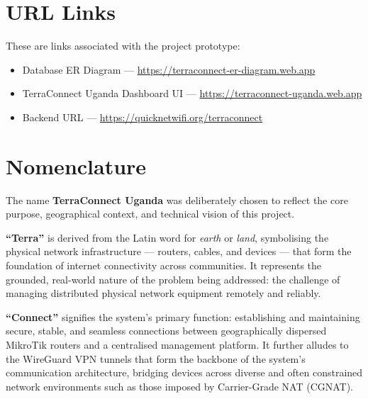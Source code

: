 \documentclass[12pt,a4paper,oneside]{report}
\begin{document}
\clearpage
\chapter*{URL Links}

These are links associated with the project prototype:

\begin{itemize}
  \item Database ER Diagram --- \href{https://terraconnect-er-diagram.web.app}{https://terraconnect-er-diagram.web.app}
  \item TerraConnect Uganda Dashboard UI --- \href{https://terraconnect-uganda.web.app}{https://terraconnect-uganda.web.app}
  \item Backend URL --- \href{https://quicknetwifi.org/terraconnect}{https://quicknetwifi.org/terraconnect}
\end{itemize}

\clearpage
\chapter*{Nomenclature}

The name \textbf{TerraConnect Uganda} was deliberately chosen to reflect the core purpose, geographical context, and technical vision of this project.

\textbf{``Terra''} is derived from the Latin word for \textit{earth} or \textit{land}, symbolising the physical network infrastructure --- routers, cables, and devices --- that form the foundation of internet connectivity across communities. It represents the grounded, real-world nature of the problem being addressed: the challenge of managing distributed physical network equipment remotely and reliably.

\textbf{``Connect''} signifies the system's primary function: establishing and maintaining secure, stable, and seamless connections between geographically dispersed MikroTik routers and a centralised management platform. It further alludes to the WireGuard VPN tunnels that form the backbone of the system's communication architecture, bridging devices across diverse and often constrained network environments such as those imposed by Carrier-Grade NAT (CGNAT).
\end{document}
